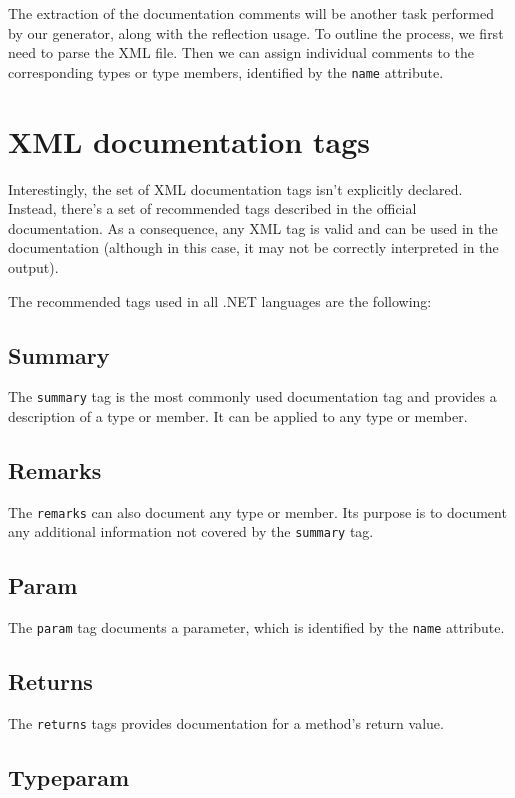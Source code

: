 The extraction of the documentation comments will be another task performed by our generator, along with the reflection usage.
To outline the process, we first need to parse the XML file. Then we can assign individual comments to the corresponding types or type members, identified by the \texttt{name} attribute.

\section{XML documentation tags}

Interestingly, the set of XML documentation tags isn't explicitly declared. 
Instead, there's a set of recommended tags described in the official documentation.
As a consequence, any XML tag is valid and can be used in the documentation 
(although in this case, it may not be correctly interpreted in the output).

The recommended tags used in all .NET languages are the following:

\subsection{Summary}
The \texttt{summary} tag is the most commonly used documentation tag and provides a description of a type or member. 
It can be applied to any type or member.

\subsection{Remarks}
The \texttt{remarks} can also document any type or member. 
Its purpose is to document any additional information not covered by the \texttt{summary} tag.

\subsection{Param}
The \texttt{param} tag documents a parameter, which is identified by the \texttt{name} attribute.

\subsection{Returns}
The \texttt{returns} tags provides documentation for a method's return value.

\subsection{Typeparam}

